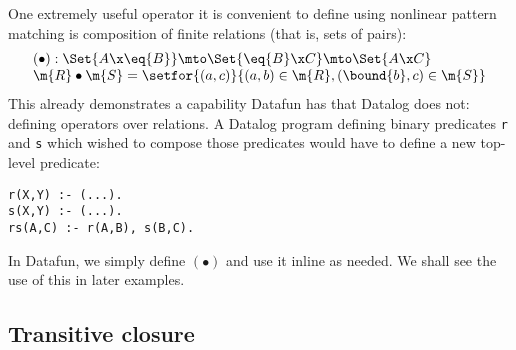 One extremely useful operator it is convenient to define using nonlinear pattern
matching is composition of finite relations (that is, sets of pairs):
\[\begin{array}{l}
(\bullet) : \Set{A \x \eq{B}} \mto \Set{\eq{B} \x C} \mto \Set{A \x C}\\
\m{R} \bullet \m{S} = \setfor{(a,c)}{(a,b) \in \m{R}, (\bound{b},c) \in \m{S}}
\end{array}\]
%
This already demonstrates a capability Datafun has that Datalog does not:
defining operators over relations. A Datalog program defining binary predicates
\texttt{r} and \texttt{s} which wished to compose those predicates would have to
define a new top-level predicate:

\begin{verbatim}
r(X,Y) :- (...).
s(X,Y) :- (...).
rs(A,C) :- r(A,B), s(B,C).
\end{verbatim}
%
In Datafun, we simply define $(\bullet)$ and use it inline as needed. We shall
see the use of this in later examples.



\subsection{Transitive closure}

